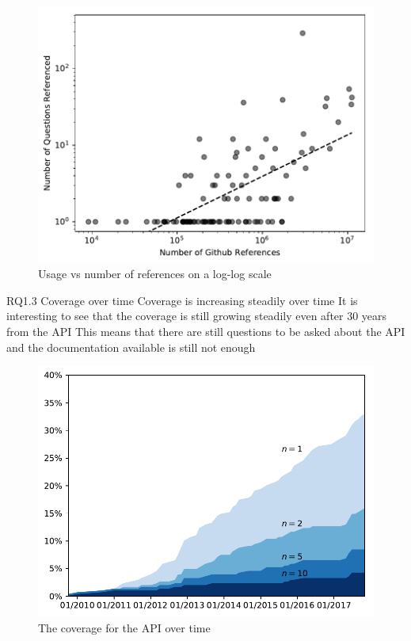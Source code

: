 \begin{figure}
  \includegraphics{scripts/figures/1-2-usage-vs-coverage}
  \caption{Usage vs number of references on a log-log scale}
  \label{fig:usageref}
\end{figure}

RQ1.3
Coverage over time
Coverage is increasing steadily over time
It is interesting to see that the coverage is still growing steadily even after 30 years from the API
This means that there are still questions to be asked about the API and the documentation available is still not enough

\begin{figure}
  \includegraphics{scripts/figures/1-3-coverage-by-time}
  \caption{The coverage for the API over time}
  \label{fig:coveragetime}
\end{figure}


